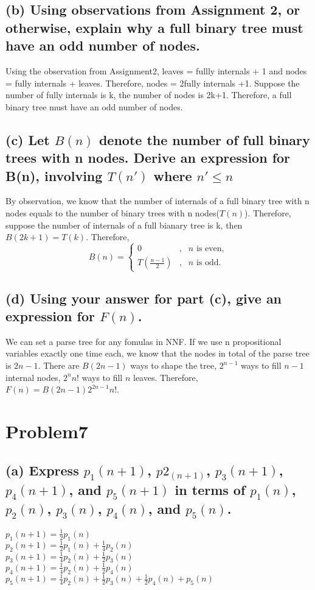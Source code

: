 \documentclass[]{article}
\begin{document}
\begin{spacing}{1.5}
	
	\subsection*{(b) Using observations from Assignment 2, or otherwise, explain why a full binary tree must have an odd number of nodes. }
	Using the observation from Assignment2, leaves = fullly internals + 1 and nodes = fully internals + leaves. Therefore, nodes = 2fully internals 	+1. Suppose the number of fully internals is k, the number of nodes is 2k+1. Therefore, a full binary tree must have an odd number of nodes.
	
	\subsection*{(c) Let $ B(n) $ denote the number of full binary trees with n nodes. Derive an expression for B(n), involving  $ T(n') $ where $ n' \leq  n $ }
	
	By observation, we know that the number of internals of a full binary tree with n nodes equals to the number of binary trees with n nodes($ T(n) $). Therefore, suppose the number of internals of a full bianary tree is k, then $ B(2k+1) = T(k) $. Therefore,
	$$ B(n)=\left\{
	\begin{aligned}
		0 & , & n \text{ is even}, \\
		T(\frac{n-1}{2}) & , & n \text{ is odd}.
	\end{aligned}
	\right.$$
	
	\subsection*{(d) Using your answer for part (c), give an expression for $ F(n) $.}
	We can set a parse tree for any fomulas in NNF. If we use n  propositional variables exactly one time each, we know that the nodes in total of the parse tree is $ 2n-1 $. There are $ B(2n-1) $ ways to shape the tree, $ 2^{n-1} $ ways to fill $ n-1 $ internal nodes, $ 2^{n}n! $ ways to fill $ n $ leaves. Therefore, $ F(n) = B(2n-1) 2^{2n-1}n!$.
		
	\section*{Problem7}
	\subsection*{(a) Express $  p_1(n + 1) $, $ p2_(n + 1) $, $ p_3(n + 1) $, $ p_4(n + 1) $, and $ p_5(n + 1) $ in terms of $  p_1(n) $, $ p_2(n) $, $ p_3(n) $, $  p_4(n) $, and $ p_5(n) $.}
	$ p_1(n+1) = \frac{1}{2}p_1(n)  $\\
	$ p_2(n+1) = \frac{1}{2}p_1(n) + \frac{1}{4}p_2(n) $\\
	$ p_3(n+1) = \frac{1}{4}p_2(n) + \frac{1}{2}p_3(n) $\\
	$ p_4(n+1) = \frac{1}{4}p_2(n) + \frac{1}{2}p_4(n)  $\\
	$ p_5(n+1) =\frac{1}{4}p_2(n) + \frac{1}{2}p_3(n)+ \frac{1}{2}p_4(n) +p_5(n) $
	

\end{spacing}
\end{document}
